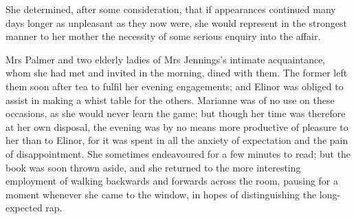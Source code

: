 She determined, after some consideration, that if appearances continued many days longer as unpleasant as they now were, she would represent in the strongest manner to her mother the necessity of some serious enquiry into the affair.

Mrs Palmer and two elderly ladies of Mrs Jennings's intimate acquaintance, whom she had met and invited in the morning, dined with them. The former left them soon after tea to fulfil her evening engagements; and Elinor was obliged to assist in making a whist table for the others. Marianne was of no use on these occasions, as she would never learn the game; but though her time was therefore at her own disposal, the evening was by no means more productive of pleasure to her than to Elinor, for it was spent in all the anxiety of expectation and the pain of disappointment. She sometimes endeavoured for a few minutes to read; but the book was soon thrown aside, and she returned to the more interesting employment of walking backwards and forwards across the room, pausing for a moment whenever she came to the window, in hopes of distinguishing the long-expected rap.